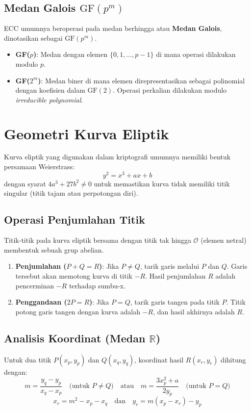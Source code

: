 \documentclass[../main.tex]{subfiles}
\begin{document}
\subsection{Medan Galois \texorpdfstring{$\text{GF}(p^m)$}{GF(p\textasciicircum m)}}
ECC umumnya beroperasi pada medan berhingga atau \textbf{Medan Galois}, dinotasikan sebagai $\text{GF}(p^m)$.
\begin{itemize}
    \item \textbf{GF($p$)}: Medan dengan elemen $\{0, 1, \dots, p-1\}$ di mana operasi dilakukan modulo $p$.
    \item \textbf{GF($2^m$)}: Medan biner di mana elemen direpresentasikan sebagai polinomial dengan koefisien dalam $\text{GF}(2)$. Operasi perkalian dilakukan modulo \textit{irreducible polynomial}.
\end{itemize}

\section{Geometri Kurva Eliptik}
Kurva eliptik yang digunakan dalam kriptografi umumnya memiliki bentuk persamaan Weierstrass:
\[ y^2 = x^3 + ax + b \]
dengan syarat $4a^3 + 27b^2 \neq 0$ untuk memastikan kurva tidak memiliki titik singular (titik tajam atau perpotongan diri).

\subsection{Operasi Penjumlahan Titik}
Titik-titik pada kurva eliptik bersama dengan titik tak hingga $\mathcal{O}$ (elemen netral) membentuk sebuah grup abelian.
\begin{enumerate}
    \item \textbf{Penjumlahan ($P + Q = R$)}: Jika $P \neq Q$, tarik garis melalui $P$ dan $Q$. Garis tersebut akan memotong kurva di titik $-R$. Hasil penjumlahan $R$ adalah pencerminan $-R$ terhadap sumbu-x.
    \item \textbf{Penggandaan ($2P = R$)}: Jika $P = Q$, tarik garis tangen pada titik $P$. Titik potong garis tangen dengan kurva adalah $-R$, dan hasil akhirnya adalah $R$.
\end{enumerate}

\subsection{Analisis Koordinat (Medan \texorpdfstring{$\mathbb{R}$}{R})}
Untuk dua titik $P(x_p, y_p)$ dan $Q(x_q, y_q)$, koordinat hasil $R(x_r, y_r)$ dihitung dengan:
\[ m = \frac{y_q - y_p}{x_q - x_p} \quad \text{(untuk } P \neq Q \text{)} \quad \text{atau} \quad m = \frac{3x_p^2 + a}{2y_p} \quad \text{(untuk } P = Q \text{)} \]
\[ x_r = m^2 - x_p - x_q \quad \text{dan} \quad y_r = m(x_p - x_r) - y_p \]
\end{document}
